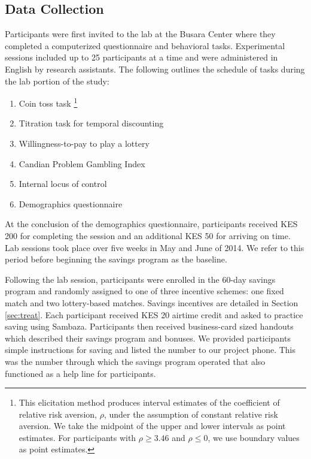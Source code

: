 \documentclass[11pt]{article}
\begin{document}
	\subsection{Data Collection}

		Participants were first invited to the lab at the Busara Center where they completed a computerized questionnaire and behavioral tasks. Experimental sessions included up to 25 participants at a time and were administered in English by research assistants. The following outlines the schedule of tasks during the lab portion of the study:

		\begin{enumerate} \setlength{\itemsep}{1pt}
		\item Coin toss task \parencite{eckel_sex_2002}\footnote{This elicitation method produces interval estimates of the coefficient of relative risk aversion, $\rho$, under the assumption of constant relative risk aversion. We take the midpoint of the upper and lower intervals as point estimates. For participants with $\rho \geq 3.46$ and $\rho \leq 0$, we use boundary values as point estimates.}
		\item Titration task for temporal discounting \parencite{cornsweet_staircase-method_1962}
		\item Willingness-to-pay to play a lottery
		\item Candian Problem Gambling Index \parencite{ferris_canadian_2001}
		\item Internal locus of control \parencite{rotter_generalized_1966}
		\item Demographics questionnaire
		\end{enumerate}

		At the conclusion of the demographics questionnaire, participants received KES 200 for completing the session and an additional KES 50 for arriving on time. Lab sessions took place over five weeks in May and June of 2014. We refer to this period before beginning the savings program as the baseline.

		Following the lab session, participants were enrolled in the 60-day savings program and randomly assigned to one of three incentive schemes: one fixed match and two lottery-based matches. Savings incentives are detailed in Section \ref{sec:treat}. Each participant received KES 20 airtime credit and asked to practice saving using Sambaza. Participants then received business-card sized handouts which described their savings program and bonuses. We provided participants simple instructions for saving and listed the number to our project phone. This was the number through which the savings program operated that also functioned as a help line for participants.
\end{document}
